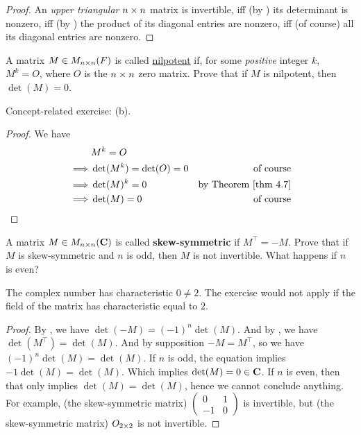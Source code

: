 \begin{proof}
An \emph{upper triangular} \(n \times n\) matrix is invertible, iff (by ) its determinant is nonzero, iff (by ) the product of its diagonal entries are nonzero, iff (of course) all its diagonal entries are nonzero.
\end{proof}

\begin{exercise} \label{exercise 4.3.10}
A matrix \(M \in M_{n \times n}(F)\) is called \href{https://www.wikiwand.com/en/Nilpotent_matrix}{nilpotent} if, for some \emph{positive} integer \(k\), \(M^k = O\), where \(O\) is the \(n \times n\) zero matrix.
Prove that if \(M\) is nilpotent, then \(\det(M) = 0\).
\end{exercise}

\begin{note}
Concept-related exercise: (b).
\end{note}

\begin{proof}
We have
\begin{align*}
             & M^k = O \\
    \implies & \det(M^k) = \det(O) = 0 & \text{of course} \\
    \implies & \det(M)^k = 0 & \text{by \THM{4.7}} \\
    \implies & \det(M) = 0 & \text{of course}
\end{align*}
\end{proof}

\begin{exercise} \label{exercise 4.3.11}
A matrix \(M \in M_{n \times n}(\mathbf{C})\) is called \textbf{skew-symmetric} if \(M^\top = -M\).
Prove that if \(M\) is skew-symmetric and \(n\) is odd, then \(M\) is not invertible.
What happens if \(n\) is even?
\end{exercise}

\begin{note}
The complex number has characteristic \(0 \ne 2\).
The exercise would not apply if the field of the matrix has characteristic equal to \(2\).
\end{note}

\begin{proof}
By , we have \(\det(-M) = (-1)^n \det(M)\).
And by , we have \(\det(M^\top) = \det(M)\).
And by supposition \(-M = M^\top\), so we have \((-1)^n \det(M) = \det(M)\).
If \(n\) is odd, the equation implies \(-1 \det(M) = \det(M)\).
Which implies \(\det(M) = 0 \in \mathbf{C}\).
If \(n\) is even, then that only implies \(\det(M) = \det(M)\), hence we cannot conclude anything.
For example, (the skew-symmetric matrix) \(\begin{pmatrix} 0 & 1 \\ -1 & 0 \end{pmatrix}\) is invertible, but (the skew-symmetric matrix) \(O_{2 \times 2}\) is not invertible.
\end{proof}

